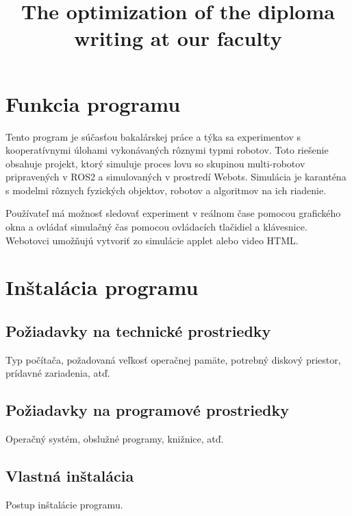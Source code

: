 \documentclass[a4paper]{feidippp}
\title{The optimization of the diploma writing at our faculty}
\begin{document}




\titulnastrana

\newpage


\tableofcontents



\newpage

\setcounter{page}{1}

\section{Funkcia programu}

Tento program je súčasťou bakalárskej práce a týka sa experimentov s kooperatívnymi úlohami vykonávaných rôznymi typmi robotov. Toto riešenie obsahuje projekt, ktorý simuluje proces lovu so skupinou multi-robotov pripravených v ROS2 a simulovaných v prostredí Webots. Simulácia je karanténa s modelmi rôznych fyzických objektov, robotov a algoritmov na ich riadenie.

\vspace{3mm}

\justifying
\noindent
Používateľ má možnosť sledovať experiment v reálnom čase pomocou grafického okna a ovládať simulačný čas pomocou ovládacích tlačidiel a klávesnice. Webotovci umožňujú vytvoriť zo simulácie applet alebo video HTML.

\section{Inštalácia programu}

\subsection{Požiadavky na technické prostriedky}

Typ počítača, požadovaná veľkosť operačnej pamäte, potrebný diskový priestor, prídavné zariadenia, atď.

\subsection{Požiadavky na programové prostriedky}
Operačný systém, obslužné programy, knižnice, atď.

\subsection{Vlastná inštalácia}

Postup inštalácie programu.
\end{document}
